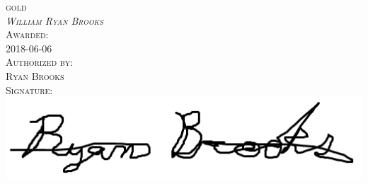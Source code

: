 \documentclass[landscape]{article}
\begin{document}
\begin{center}
\Huge
\textsc{gold}
\bigskip 
\\  
\textsc{\emph{William Ryan Brooks}}
\bigskip
\\ 
\textsc{Awarded:} 
\bigskip
\\ 
\textsc{2018-06-06}
\bigskip
\\ 
\textsc{Authorized by:} 
\bigskip
\\ 
\textsc{Ryan Brooks}
\bigskip
\\ 
\textsc{Signature: }
\bigskip
\\ 
\includegraphics{1528324093101_signature.PNG}
\end{center}
\end{document}
